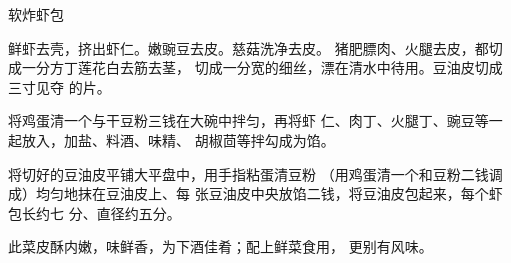 \begin{recipe}{软炸虾包}

\ingredients




\cooking

\step 鲜虾去壳，挤出虾仁。嫩豌豆去皮。慈菇洗净去皮。 猪肥膘肉、火腿去皮，都切成一分方丁莲花白去筋去茎， 切成一分宽的细丝，漂在清水中待用。豆油皮切成三寸见夺 的片。

\step 将鸡蛋清一个与干豆粉三钱在大碗中拌匀，再将虾 仁、肉丁、火腿丁、豌豆等一起放入，加盐、料酒、味精、 胡椒茴等拌勾成为馅。

将切好的豆油皮平铺大平盘中，用手指粘蛋清豆粉 （用鸡蛋清一个和豆粉二钱调成）均匀地抹在豆油皮上、每 张豆油皮中央放馅二钱，将豆油皮包起来，每个虾包长约七 分、直径约五分。

\notes

此菜皮酥内嫩，味鲜香，为下酒佳肴；配上鲜菜食用， 更别有风味。

\end{recipe}

